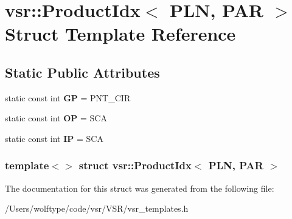 \hypertarget{structvsr_1_1_product_idx_3_01_p_l_n_00_01_p_a_r_01_4}{\section{vsr\-:\-:Product\-Idx$<$ P\-L\-N, P\-A\-R $>$ Struct Template Reference}
\label{structvsr_1_1_product_idx_3_01_p_l_n_00_01_p_a_r_01_4}
}
\subsection*{Static Public Attributes}
\begin{DoxyCompactItemize}
\item 
\hypertarget{structvsr_1_1_product_idx_3_01_p_l_n_00_01_p_a_r_01_4_ae1de580939fa73b734f924ea9a53d6d6}{static const int {\bfseries G\-P} = P\-N\-T\-\_\-\-C\-I\-R}\label{structvsr_1_1_product_idx_3_01_p_l_n_00_01_p_a_r_01_4_ae1de580939fa73b734f924ea9a53d6d6}

\item 
\hypertarget{structvsr_1_1_product_idx_3_01_p_l_n_00_01_p_a_r_01_4_aff5834bf60fb1aa9b94e7b0522150988}{static const int {\bfseries O\-P} = S\-C\-A}\label{structvsr_1_1_product_idx_3_01_p_l_n_00_01_p_a_r_01_4_aff5834bf60fb1aa9b94e7b0522150988}

\item 
\hypertarget{structvsr_1_1_product_idx_3_01_p_l_n_00_01_p_a_r_01_4_a74f3fda38bf00f3e4880035c85834d78}{static const int {\bfseries I\-P} = S\-C\-A}\label{structvsr_1_1_product_idx_3_01_p_l_n_00_01_p_a_r_01_4_a74f3fda38bf00f3e4880035c85834d78}

\end{DoxyCompactItemize}
\subsubsection*{template$<$$>$ struct vsr\-::\-Product\-Idx$<$ P\-L\-N, P\-A\-R $>$}



The documentation for this struct was generated from the following file\-:\begin{DoxyCompactItemize}
\item 
/\-Users/wolftype/code/vsr/\-V\-S\-R/vsr\-\_\-templates.\-h\end{DoxyCompactItemize}
